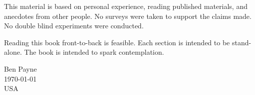 This material is based on personal experience, reading published materials, and anecdotes from other people. No surveys were taken to support the claims made. No double blind experiments were conducted. 

Reading this book front-to-back is feasible. Each section is intended to be stand-alone. The book is intended to spark contemplation. 


\begin{flushright}
Ben Payne\\
\today\\
USA
\end{flushright}


